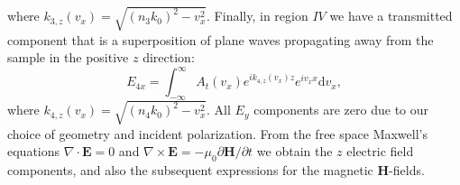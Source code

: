 where $k_{3,z}(v_x)=\sqrt{(n_{3}k_0)^2-v_x^2}$. Finally, in region $IV$ we have a transmitted component that is a superposition of plane waves propagating away from the sample in the positive $z$ direction:
\begin{equation} %
E_{4x}=\int_{-\infty}^{\infty}A_t(v_x)e^{ik_{4,z}(v_x)z} e^{iv_x x}\text{d}v_x,
\label{eq:E4x}
\end{equation}
where $k_{4,z}(v_x)=\sqrt{(n_{\text{4}} k_0)^2-v_x^2}$. All $E_y$ components are zero due to our choice of  geometry and incident polarization. From the free space Maxwell's equations $\nabla \cdot \mathbf{E}=0$ and $\nabla \times \mathbf{E}=-\mu_0\partial \mathbf{H}/\partial  t$ we obtain the $z$ electric field components, and also the subsequent expressions for the magnetic $\mathbf{H}$-fields.


